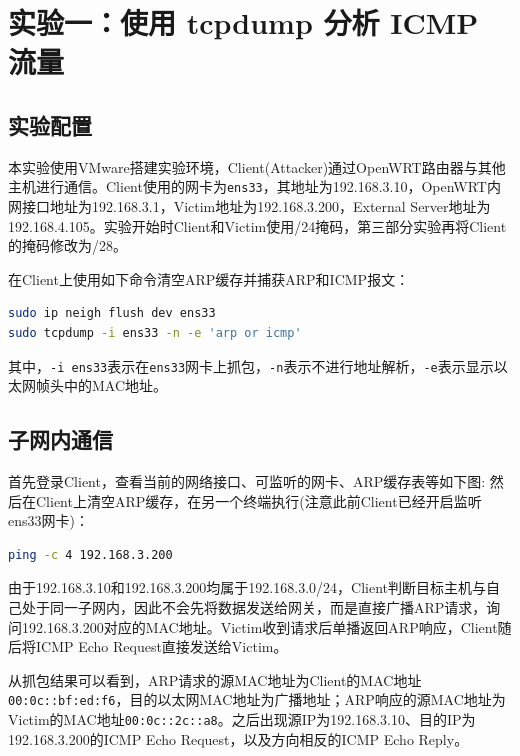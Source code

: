 \section{实验一：使用 tcpdump 分析 ICMP 流量}

\subsection{实验配置}

本实验使用VMware搭建实验环境，Client(Attacker)通过OpenWRT路由器与其他主机进行通信。Client使用的网卡为\texttt{ens33}，其地址为192.168.3.10，OpenWRT内网接口地址为192.168.3.1，Victim地址为192.168.3.200，External Server地址为192.168.4.105。实验开始时Client和Victim使用/24掩码，第三部分实验再将Client的掩码修改为/28。

在Client上使用如下命令清空ARP缓存并捕获ARP和ICMP报文：
\begin{lstlisting}[language=bash,caption={Client上的tcpdump抓包命令}]
sudo ip neigh flush dev ens33
sudo tcpdump -i ens33 -n -e 'arp or icmp'
\end{lstlisting}

其中，\texttt{-i ens33}表示在\texttt{ens33}网卡上抓包，\texttt{-n}表示不进行地址解析，\texttt{-e}表示显示以太网帧头中的MAC地址。

\subsection{子网内通信}
首先登录Client，查看当前的网络接口、可监听的网卡、ARP缓存表等如下图:
然后在Client上清空ARP缓存，在另一个终端执行(注意此前Client已经开启监听ens33网卡)：
\begin{lstlisting}[language=bash,caption={子网内通信测试}]
ping -c 4 192.168.3.200
\end{lstlisting}

由于192.168.3.10和192.168.3.200均属于192.168.3.0/24，Client判断目标主机与自己处于同一子网内，因此不会先将数据发送给网关，而是直接广播ARP请求，询问192.168.3.200对应的MAC地址。Victim收到请求后单播返回ARP响应，Client随后将ICMP Echo Request直接发送给Victim。

从抓包结果可以看到，ARP请求的源MAC地址为Client的MAC地址\texttt{00:\allowbreak 0c::\allowbreak bf:\allowbreak ed:\allowbreak f6}，目的以太网MAC地址为广播地址；ARP响应的源MAC地址为Victim的MAC地址\texttt{00:\allowbreak 0c::\allowbreak 2c::\allowbreak a8}。之后出现源IP为192.168.3.10、目的IP为192.168.3.200的ICMP Echo Request，以及方向相反的ICMP Echo Reply。

